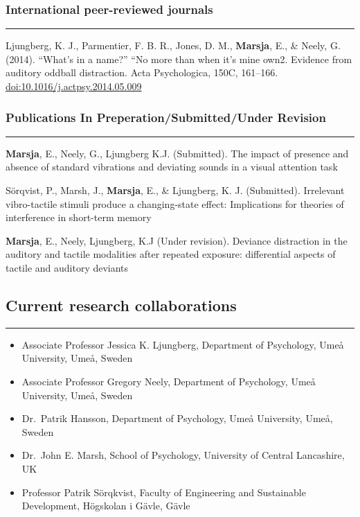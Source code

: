 \documentclass[]{article}
\providecommand{\tightlist}{%
  \setlength{\itemsep}{0pt}\setlength{\parskip}{0pt}}
\begin{document}
\subsubsection{International peer-reviewed
journals}\label{international-peer-reviewed-journals}

\hrule

Ljungberg, K. J., Parmentier, F. B. R., Jones, D. M., \textbf{Marsja},
E., \& Neely, G. (2014). ``What's in a name?'' ``No more than when it's
mine own2. Evidence from auditory oddball distraction. Acta
Psychologica, 150C, 161--166. \url{doi:10.1016/j.actpsy.2014.05.009}

\subsubsection{Publications In Preperation/Submitted/Under
Revision}\label{publications-in-preperationsubmittedunder-revision}

\hrule

\textbf{Marsja}, E., Neely, G., Ljungberg K.J. (Submitted). The impact
of presence and absence of standard vibrations and deviating sounds in a
visual attention task

Sörqvist, P., Marsh, J., \textbf{Marsja}, E., \& Ljungberg, K. J.
(Submitted). Irrelevant vibro-tactile stimuli produce a changing-state
effect: Implications for theories of interference in short-term memory

\textbf{Marsja}, E., Neely, Ljungberg, K.J (Under revision). Deviance
distraction in the auditory and tactile modalities after repeated
exposure: differential aspects of tactile and auditory deviants

\subsection{Current research
collaborations}\label{current-research-collaborations}

\hrule

\begin{itemize}
\tightlist
\item
  Associate Professor Jessica K. Ljungberg, Department of Psychology,
  Umeå University, Umeå, Sweden
\item
  Associate Professor Gregory Neely, Department of Psychology, Umeå
  University, Umeå, Sweden
\item
  Dr.~Patrik Hansson, Department of Psychology, Umeå University, Umeå,
  Sweden
\item
  Dr.~John E. Marsh, School of Psychology, University of Central
  Lancashire, UK
\item
  Professor Patrik Sörqkvist, Faculty of Engineering and Sustainable
  Development, Högskolan i Gävle, Gävle
\end{itemize}
\end{document}
